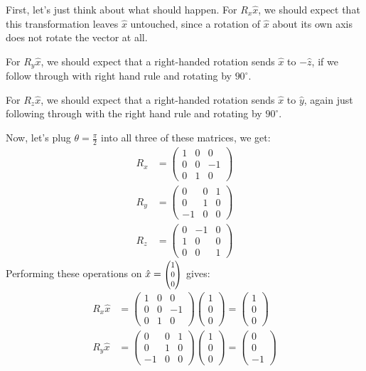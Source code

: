 \documentclass{article}
\begin{document}
	\begin{solution}
		First, let's just think about what should happen. For $R_x \hat{x}$, we should expect that this 
		transformation leaves $\hat{x}$ untouched, since a rotation of $\hat{x}$ about its own axis does 
		not rotate the vector at all. 

		For $R_y \hat{x}$, we should expect that a right-handed rotation sends $\hat{x}$ to $-\hat{z}$, if
		we follow through with right hand rule and rotating by $90^\circ$. 

		For $R_z \hat{x}$, we should expect that a right-handed rotation sends $\hat{x}$ to $\hat{y}$, again 
		just following through with the right hand rule and rotating by $90^\circ$. 

		Now, let's plug  $\theta = \frac{\pi}{2}$ into all three of these matrices, we get:
		\begin{align*}
			R_x &= \begin{pmatrix} 1&0&0\\0&0&-1\\0&1&0 \end{pmatrix} \\
			R_y &=  \begin{pmatrix} 0&0&1\\0&1&0\\-1&0&0 \end{pmatrix}  \\
			R_z &= \begin{pmatrix} 0&-1&0\\1&0&0\\0&0&1 \end{pmatrix} 
		\end{align*}
		Performing these operations on $\hat{x} = \smthreevect{1}{0}{0}$ gives:
		\begin{align*}
			R_x \hat{x} &= \begin{pmatrix} 1&0&0\\0&0&-1\\0&1&0 \end{pmatrix}\begin{pmatrix} 1\\0\\0 \end{pmatrix} = \begin{pmatrix} 1\\0\\0 \end{pmatrix} \\
			R_y \hat{x} &= \begin{pmatrix} 0&0&1\\0&1&0\\-1&0&0 \end{pmatrix} \begin{pmatrix} 1\\0\\0 \end{pmatrix}	= \begin{pmatrix} 0\\0\\-1 \end{pmatrix} \\

\end{align*}
\end{solution}
\end{document}
